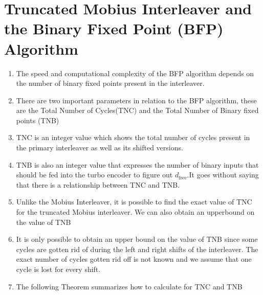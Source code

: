 \documentclass[fontsize=12pt]{article}
\begin{document}
\section{Truncated Mobius Interleaver and the Binary Fixed Point (BFP) Algorithm}
\begin{enumerate}
\item The speed and computational complexity of the BFP algorithm depends on the number of binary fixed points present in the interleaver.

\item There are two important parameters in relation to the BFP algorithm, these are the Total Number of Cycles(TNC) and  the Total Number of Binary fixed points (TNB)

\item TNC is an integer value which shows the total number of cycles present in the primary interleaver as well as its shifted versions.

\item TNB is also an integer value that expresses the number of binary inputs that should be fed into the turbo encoder to figure out $d_{\text{free}}$.It goes without saying that there is a relationship between TNC and TNB.

\item Unlike the Mobius Interleaver, it is possible to find the exact value of TNC for the truncated Mobius interleaver. We can also obtain an upperbound on the value of TNB

\item It is only possible to obtain an upper bound on the value of TNB since some cycles are gotten rid of during the left and right shifts of the interleaver. The exact number of cycles gotten rid off is not known and we assume that one cycle is lost for every shift.

\item The following Theorem summarizes how to calculate for TNC and TNB

\end{enumerate}
\end{document}
